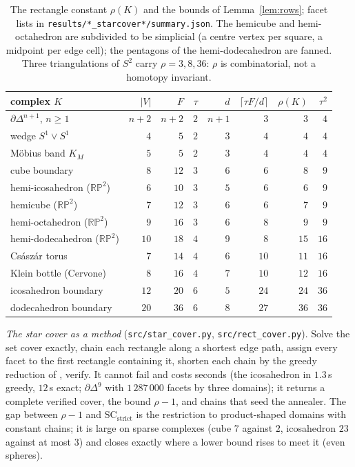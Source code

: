 \documentclass[12pt]{article}
\newcommand{\SC}{\mathrm{SC}}
\newcommand{\SCst}{\SC_{\mathrm{strict}}}
\begin{document}
\begin{table}[H]
\centering\footnotesize
\setlength{\tabcolsep}{4pt}
\begin{tabular}{@{}lrrrrrrr@{}}
\toprule
complex $K$ & $|V|$ & $F$ & $\tau$ & $d$ &
$\lceil\tau F/d\rceil$ & $\rho(K)$ & $\tau^2$ \\
\midrule
$\partial\Delta^{n+1}$, $n\ge1$ & $n{+}2$ & $n{+}2$ & $2$ & $n{+}1$ & $3$ & $3$ & $4$\\
wedge $S^1\vee S^1$ & $4$ & $5$ & $2$ & $3$ & $4$ & $4$ & $4$\\
M\"obius band $K_M$ & $5$ & $5$ & $2$ & $3$ & $4$ & $4$ & $4$\\
cube boundary & $8$ & $12$ & $3$ & $6$ & $6$ & $8$ & $9$\\
hemi-icosahedron ($\mathbb{RP}^2$) & $6$ & $10$ & $3$ & $5$ & $6$ & $6$ & $9$\\
hemicube ($\mathbb{RP}^2$) & $7$ & $12$ & $3$ & $6$ & $6$ & $7$ & $9$\\
hemi-octahedron ($\mathbb{RP}^2$) & $9$ & $16$ & $3$ & $6$ & $8$ & $9$ & $9$\\
hemi-dodecahedron ($\mathbb{RP}^2$) & $10$ & $18$ & $4$ & $9$ & $8$ & $15$ & $16$\\
Cs\'asz\'ar torus & $7$ & $14$ & $4$ & $6$ & $10$ & $11$ & $16$\\
Klein bottle (Cervone) & $8$ & $16$ & $4$ & $7$ & $10$ & $12$ & $16$\\
icosahedron boundary & $12$ & $20$ & $6$ & $5$ & $24$ & $24$ & $36$\\
dodecahedron boundary & $20$ & $36$ & $6$ & $8$ & $27$ & $36$ & $36$\\
\bottomrule
\end{tabular}
\caption{The rectangle constant $\rho(K)$ and the bounds of
Lemma~\ref{lem:rows}; facet lists in \texttt{results/*\_starcover*/summary.json}.
The hemicube and hemi-octahedron are subdivided to be simplicial (a centre
vertex per square, a midpoint per edge cell); the pentagons of the
hemi-dodecahedron are fanned.  Three triangulations of $S^2$ carry
$\rho=3,8,36$: $\rho$ is combinatorial, not a homotopy invariant.}
\label{tab:rho}
\end{table}

\emph{The star cover as a method} (\texttt{src/star\_cover.py},
\texttt{src/rect\_cover.py}).  Solve the set cover exactly, chain each
rectangle along a shortest edge path, assign every facet to the first
rectangle containing it, shorten each chain by the greedy reduction of
\cite[Alg.~2]{OLGB21}, verify.  It cannot fail and costs seconds (the
icosahedron in $1.3$\,s greedy, $12$\,s exact; $\partial\Delta^9$ with
$1\,287\,000$ facets by three domains); it returns a complete verified cover,
the bound $\rho-1$, and chains that seed the annealer.  The gap between
$\rho-1$ and $\SCst$ is the restriction to product-shaped domains with
constant chains; it is large on sparse complexes (cube $7$ against $2$,
icosahedron $23$ against at most $3$) and closes exactly where a lower bound
rises to meet it (even spheres).
\end{document}
